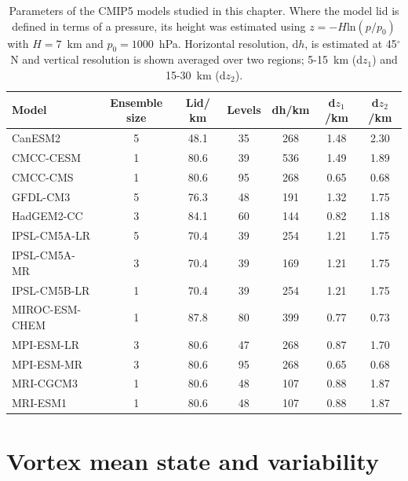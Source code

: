 \begin{table}[htbp]
\small
\centering
\begin{tabular}{lcccccc} \hline
Model          & Ensemble size & Lid/ km & Levels & dh/km & d$z_{1}$/km & d$z_{2}$/km \\ \hline
CanESM2        & 5 & 48.1    & 35     & 268          & 1.48         & 2.30          \\
CMCC-CESM      & 1 & 80.6    & 39     & 536          & 1.49         & 1.89          \\
CMCC-CMS       & 1 & 80.6    & 95     & 268          & 0.65         & 0.68          \\
GFDL-CM3       & 5 & 76.3    & 48     & 191          & 1.32         & 1.75           \\
HadGEM2-CC     & 3 & 84.1    & 60     & 144          & 0.82         & 1.18          \\
IPSL-CM5A-LR   & 5 & 70.4    & 39     & 254          & 1.21         & 1.75          \\
IPSL-CM5A-MR   & 3 & 70.4    & 39     & 169          & 1.21         & 1.75          \\
IPSL-CM5B-LR   & 1 & 70.4    & 39     & 254          & 1.21         & 1.75          \\
MIROC-ESM-CHEM & 1 & 87.8    & 80     & 399          & 0.77         & 0.73          \\
MPI-ESM-LR     & 3 & 80.6    & 47     & 268          & 0.87         & 1.70            \\
MPI-ESM-MR     & 3 & 80.6    & 95     & 268          & 0.65         & 0.68          \\
MRI-CGCM3      & 1 & 80.6    & 48     & 107          & 0.88         & 1.87          \\
MRI-ESM1       & 1 & 80.6    & 48     & 107          & 0.88         & 1.87 \\ \hline 
\end{tabular}
\caption[CMIP5 model parameters.]{Parameters of the CMIP5 models studied in this
  chapter. Where the model lid is defined in terms of a pressure, its height was
  estimated using $z=-H\mathrm{ln}(p/p_{0})$ with $H=7$~km and
  $p_{0}=1000$~hPa. Horizontal resolution, d$h$, is estimated at 45$^{\circ}$N
  and vertical resolution is shown averaged over two regions; 5-15~km (d$z_{1}$)
  and 15-30~km (d$z_{2}$).} 
\label{tab:models}
\end{table}




\section{Vortex mean state and variability}
